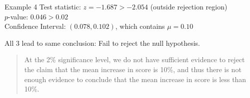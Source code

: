 \documentclass[t]{beamer}
\begin{document}
\begin{frame}{Example 4}
Test statistic: $z = -1.687 > -2.054$ (outside rejection region)	\newline\\
$p$-value: $0.046 > 0.02$	\newline\\
Confidence Interval: $(0.078, 0.102)$, which contains $\mu = 0.10$	\newline\\	\pause

All 3 lead to same conclusion: Fail to reject the null hypothesis.	\newline\\	\pause

\begin{quote}
At the 2\% significance level, we do not have sufficient evidence to reject the claim that the mean increase in score is 10\%, and thus there is not enough evidence to conclude that the mean increase in score is less than 10\%.
\end{quote}
\end{frame}
\end{document}
